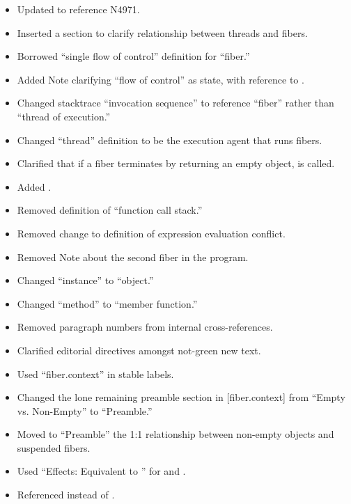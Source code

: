 \begin{itemize}
    \item Updated to reference N4971.
    \item Inserted a section to clarify relationship between threads and fibers.
    \item Borrowed ``single flow of control'' definition for ``fiber.''
    \item Added Note clarifying ``flow of control'' as state, with reference
    to .
    \item Changed stacktrace ``invocation sequence'' to reference ``fiber'' rather
    than ``thread of execution.''
    \item Changed ``thread'' definition to be the execution agent that runs fibers.
    \item Clarified that if a fiber terminates by returning an empty \fiber
          object, \termn is called.
    \item Added .
    \item Removed definition of ``function call stack.''
    \item Removed change to definition of expression evaluation conflict.
    \item Removed Note about the second fiber in the program.
    \item Changed ``\fiber instance'' to ``\fiber object.''
    \item Changed ``method'' to ``member function.''
    \item Removed paragraph numbers from internal cross-references.
    \item Clarified editorial directives amongst not-green new text.
    \item Used ``fiber.context'' in stable labels.
    \item Changed the lone remaining preamble section in [fiber.context] from
    ``Empty vs. Non-Empty'' to ``Preamble.''
    \item Moved to ``Preamble'' the 1:1 relationship between non-empty \fiber
    objects and suspended fibers.
    \item Used ``Effects: Equivalent to '' for
     and .
    \item Referenced \justmain instead of \main.
\end{itemize}


